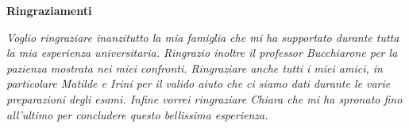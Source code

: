 \thispagestyle{empty}

\begin{center}
  {\bf \Huge Ringraziamenti}
\end{center}

\vspace{4cm}

\emph{Voglio ringraziare inanzitutto la mia famiglia che mi ha supportato durante tutta la mia esperienza universitaria.
Ringrazio inoltre il professor Bucchiarone per la pazienza mostrata nei miei confronti.
Ringraziare anche tutti i miei amici, in particolare Matilde e Irini per il valido aiuto che ci siamo dati durante le varie preparazioni degli esami.
Infine vorrei ringraziare Chiara che mi ha spronato fino all'ultimo per concludere questo bellissima esperienza.
}
